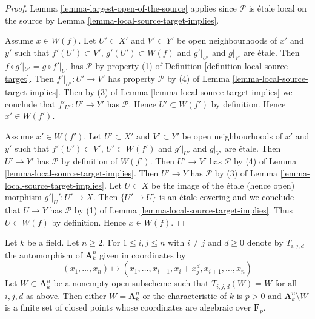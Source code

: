 \begin{proof}
Lemma \ref{lemma-largest-open-of-the-source} applies since
$\mathcal{P}$ is \'etale local on the source by
Lemma \ref{lemma-local-source-target-implies}.

\medskip\noindent
Assume $x \in W(f)$. Let $U' \subset X'$ and $V' \subset Y'$
be open neighbourhoods of $x'$ and $y'$ such that $f'(U') \subset V'$,
$g'(U') \subset W(f)$ and $g'|_{U'}$ and $g|_{V'}$ are \'etale.
Then $f \circ g'|_{U'} = g \circ f'|_{U'}$
has $\mathcal{P}$ by property (1) of
Definition \ref{definition-local-source-target}.
Then $f'|_{U'} : U' \to V'$ has property $\mathcal{P}$
by (4) of Lemma \ref{lemma-local-source-target-implies}.
Then by (3) of Lemma \ref{lemma-local-source-target-implies}
we conclude that $f'_{U'} : U' \to Y'$ has $\mathcal{P}$.
Hence $U' \subset W(f')$ by definition. Hence $x' \in W(f')$.

\medskip\noindent
Assume $x' \in W(f')$. Let $U' \subset X'$ and $V' \subset Y'$
be open neighbourhoods of $x'$ and $y'$ such that $f'(U') \subset V'$,
$U' \subset W(f')$ and $g'|_{U'}$ and $g|_{V'}$ are \'etale.
Then $U' \to Y'$ has $\mathcal{P}$ by definition of $W(f')$.
Then $U' \to V'$ has $\mathcal{P}$ by (4) of
Lemma \ref{lemma-local-source-target-implies}.
Then $U' \to Y$ has $\mathcal{P}$ by (3) of
Lemma \ref{lemma-local-source-target-implies}.
Let $U \subset X$ be the image of the \'etale (hence open)
morphism $g'|_U' : U' \to X$. Then $\{U' \to U\}$
is an \'etale covering and we conclude that
$U \to Y$ has $\mathcal{P}$ by (1) of
Lemma \ref{lemma-local-source-target-implies}.
Thus $U \subset W(f)$ by definition. Hence $x \in W(f)$.
\end{proof}

\begin{lemma}
\label{lemma-orbits}
Let $k$ be a field. Let $n \geq 2$. For $1 \leq i, j \leq n$ with
$i \not = j$ and $d \geq 0$ denote by $T_{i, j, d}$ the automorphism
of $\mathbf{A}^n_k$ given in coordinates by
$$
(x_1, \ldots, x_n) \longmapsto
(x_1, \ldots, x_{i - 1}, x_i + x_j^d, x_{i + 1}, \ldots, x_n)
$$
Let $W \subset \mathbf{A}^n_k$ be a nonempty open subscheme
such that $T_{i, j, d}(W) = W$ for all $i, j, d$ as above.
Then either $W = \mathbf{A}^n_k$ or the characteristic of $k$
is $p > 0$ and $\mathbf{A}^n_k \setminus W$ is a finite set
of closed points whose coordinates are algebraic over $\mathbf{F}_p$.
\end{lemma}

